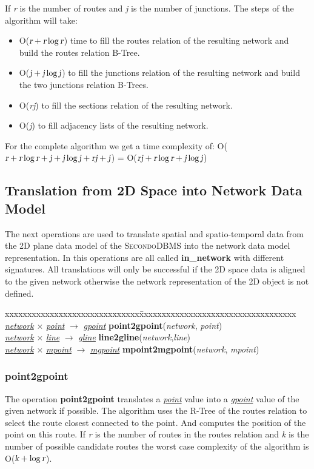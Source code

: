 \documentclass[a4paper]{article}
\newcommand{\secondo}{\textsc{Secondo}}
\newcommand{\op}[1]{\textbf{#1}}
\newcommand{\var}[1]{\textsl{#1}}
\newcommand{\dt}[1]{\textsl{\underline{#1}}}
\begin{document}
If \var{r} is the number of routes and \var{j} is the number of junctions. The steps of the algorithm will take:
\begin{itemize}
\item O($\var{r} + \var{r} \log \var{r}$) time to fill the routes relation of the resulting network and build the routes relation B-Tree.
\item O($\var{j} + \var{j} \log \var{j}$) to fill the junctions relation of the resulting network and build the two junctions relation B-Trees.
\item O(\var{rj}) to fill the sections relation of the resulting network.
\item O(\var{j}) to fill adjacency lists of the resulting network.
\end{itemize}
For the complete algorithm we get a time complexity of:
O($\var{r} + \var{r} \log \var{r} + \var{j} + \var{j} \log \var{j} +\var{rj}+\var{j}$) =
O($\var{rj} + \var{r} \log \var{r} + \var{j} \log \var{j}$)
\subsection{Translation from 2D Space into Network Data Model}
The next operations are used to translate spatial and spatio-temporal data from the 2D plane data model \cite{594784,335426,352963} of the \secondo{}DBMS into the network data model representation. In \cite{1146465} this operations are all called \op{in\_network} with different signatures. All translations will only be successful if the 2D space data is aligned to the given network otherwise the network representation of the 2D object is not defined.
\begin{tabbing}
xxxxxxxxxxxxxxxxxxxxxxxxxxxxxx\=xxxxxxxxxxxxxxxxxxxxxxxxxxxxxxxxxxx\kill
\dt{network} $\times$ \dt{point} $\rightarrow$ \dt{gpoint} \> \op{point2gpoint}(\var{network}, \var{point})\\
\dt{network} $\times$ \dt{line} $\rightarrow$ \dt{gline} \> \op{line2gline}(\var{network},\var{line})\\
\dt{network} $\times$ \dt{mpoint} $\rightarrow$ \dt{mgpoint} \> \op{mpoint2mgpoint}(\var{network}, \var{mpoint})\\
\end{tabbing}
\subsubsection{\op{point2gpoint}}
The operation \op{point2gpoint} translates a \dt{point} value into a \dt{gpoint} value of the given network if possible. The algorithm uses the R-Tree of the routes relation to select the route closest connected to the point. And computes the position of the point on this route. If \var{r} is the number of routes in the routes relation and \var{k} is the number of possible candidate routes the worst case complexity of the algorithm is O($\var{k} + \log \var{r}$).
\end{document}

